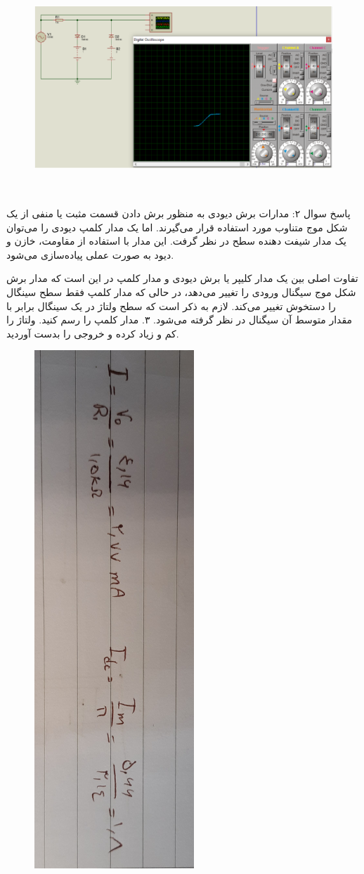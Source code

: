 \documentclass[12pt]{article}
\begin{document}
\begin{figure}[H]
	\begin{center}
		\includegraphics[width=\textwidth, height=8cm]{./images/8.4}
	\end{center}
\end{figure}

پاسخ سوال ۲:
مدارات برش دیودی به منظور برش دادن قسمت مثبت یا منفی از یک شکل موج متناوب مورد استفاده قرار می‌گیرند. اما یک مدار کلمپ دیودی را می‌توان یک مدار شیفت دهنده سطح در نظر گرفت. این مدار با استفاده از مقاومت، خازن و دیود به صورت عملی پیاده‌سازی می‌شود.

تفاوت اصلی بین یک مدار کلیپر یا برش دیودی و مدار کلمپ در این است که مدار برش شکل موج سیگنال ورودی را تغییر می‌دهد، در حالی که مدار کلمپ فقط سطح  سینگال را دستخوش تغییر می‌کند. لازم به ذکر است که سطح ولتاژ  در یک سینگال برابر با مقدار متوسط آن سیگنال در نظر گرفته می‌شود.
۳. مدار کلمپ را رسم کنید. ولتاژ  را کم و زیاد کرده و خروجی را بدست آوردید.
\begin{figure}[H]
	\begin{center}
		\includegraphics[width=6cm, height=\textwidth, angle=90]{./images/8.i.3}
	\end{center}
\end{figure}
\end{document}
